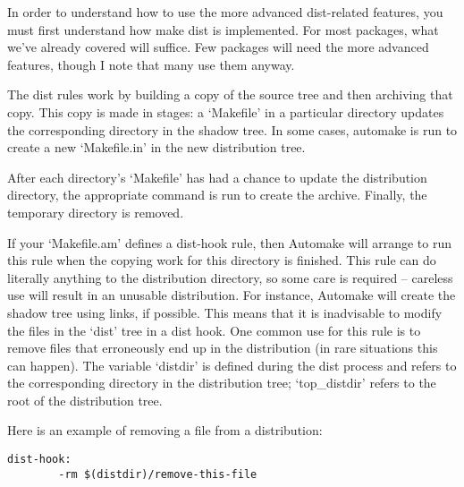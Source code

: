 In order to understand how to use the more advanced dist-related features, you must first understand how make dist is implemented. For most packages, what we've already covered will suffice. Few packages will need the more advanced features, though I note that many use them anyway.

The dist rules work by building a copy of the source tree and then archiving that copy. This copy is made in stages: a `Makefile' in a particular directory updates the corresponding directory in the shadow tree. In some cases, automake is run to create a new `Makefile.in' in the new distribution tree.

After each directory's `Makefile' has had a chance to update the distribution directory, the appropriate command is run to create the archive. Finally, the temporary directory is removed.

If your `Makefile.am' defines a dist-hook rule, then Automake will arrange to run this rule when the copying work for this directory is finished. This rule can do literally anything to the distribution directory, so some care is required -- careless use will result in an unusable distribution. For instance, Automake will create the shadow tree using links, if possible. This means that it is inadvisable to modify the files in the `dist' tree in a dist hook. One common use for this rule is to remove files that erroneously end up in the distribution (in rare situations this can happen). The variable `distdir' is defined during the dist process and refers to the corresponding directory in the distribution tree; `top\_{}distdir' refers to the root of the distribution tree.

Here is an example of removing a file from a distribution: 

\begin{Verbatim}[frame=single]
dist-hook:
        -rm $(distdir)/remove-this-file
\end{Verbatim}

